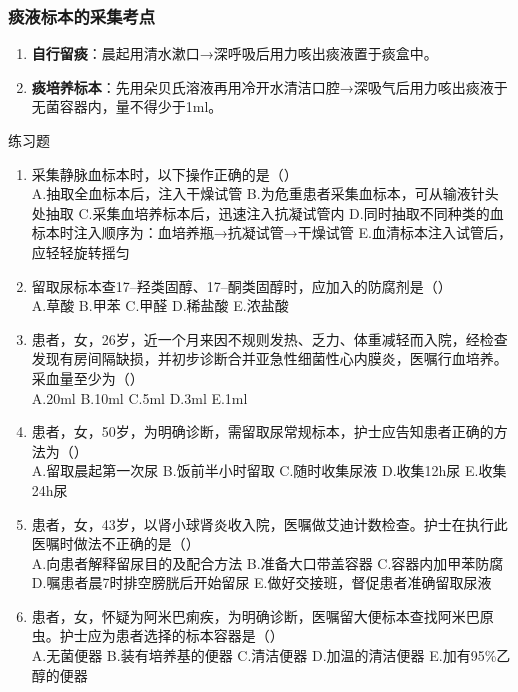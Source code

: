 \documentclass[11pt, a4paper]{ctexart}
\begin{document}
\subsubsection{痰液标本的采集考点}
\begin{enumerate}
	\item \textbf{自行留痰}：晨起用清水漱口→深呼吸后用力咳出痰液置于痰盒中。
	\item \textbf{痰培养标本}：先用朵贝氏溶液再用冷开水清洁口腔→深吸气后用力咳出痰液于无菌容器内，量不得少于1ml。
\end{enumerate}

\begin{examplebox}{练习题}
	\begin{enumerate}
		\item 采集静脉血标本时，以下操作正确的是（\qquad）\\
		      A.抽取全血标本后，注入干燥试管 \quad B.为危重患者采集血标本，可从输液针头处抽取 \quad C.采集血培养标本后，迅速注入抗凝试管内 \quad D.同时抽取不同种类的血标本时注入顺序为：血培养瓶→抗凝试管→干燥试管 \quad E.血清标本注入试管后，应轻轻旋转摇匀
		\item 留取尿标本查17–羟类固醇、17–酮类固醇时，应加入的防腐剂是（\qquad）\\
		      A.草酸 \quad B.甲苯 \quad C.甲醛 \quad D.稀盐酸 \quad E.浓盐酸
		\item 患者，女，26岁，近一个月来因不规则发热、乏力、体重减轻而入院，经检查发现有房间隔缺损，并初步诊断合并亚急性细菌性心内膜炎，医嘱行血培养。采血量至少为（\qquad）\\
		      A.20ml \quad B.10ml \quad C.5ml \quad D.3ml \quad E.1ml
		\item 患者，女，50岁，为明确诊断，需留取尿常规标本，护士应告知患者正确的方法为（\qquad）\\
		      A.留取晨起第一次尿 \quad B.饭前半小时留取 \quad C.随时收集尿液 \quad D.收集12h尿 \quad E.收集24h尿
		\item 患者，女，43岁，以肾小球肾炎收入院，医嘱做艾迪计数检查。护士在执行此医嘱时做法不正确的是（\qquad）\\
		      A.向患者解释留尿目的及配合方法 \quad B.准备大口带盖容器 \quad C.容器内加甲苯防腐 \quad D.嘱患者晨7时排空膀胱后开始留尿 \quad E.做好交接班，督促患者准确留取尿液
		\item 患者，女，怀疑为阿米巴痢疾，为明确诊断，医嘱留大便标本查找阿米巴原虫。护士应为患者选择的标本容器是（\qquad）\\
		      A.无菌便器 \quad B.装有培养基的便器 \quad C.清洁便器 \quad D.加温的清洁便器 \quad E.加有95\%乙醇的便器
	\end{enumerate}
\end{examplebox}
\end{document}
